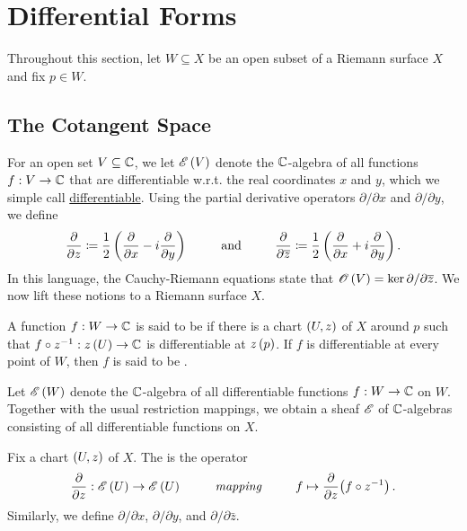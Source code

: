 \documentclass[../Moduli_Spaces_of_Riemann_Surfaces.tex]{subfiles}
\begin{document}
    \section{Differential Forms}
    Throughout this section, let $W\subseteq X$ be an open subset of a Riemann surface $X$ and fix $p\in W$.
    \subsection{The Cotangent Space}
    For an open set $V\subseteq\mathbb{C}$, we let $\mathscr{E}\left(V\right)$ denote the $\mathbb{C}$-algebra of all functions $f:V\to\mathbb{C}$ that are differentiable w.r.t. the real coordinates $x$ and $y$, which we simple call \ul{differentiable}. Using the partial derivative operators $\partial/\partial x$ and $\partial/\partial y$, we define
    \begin{equation*}
        \frac{\partial}{\partial z}\coloneqq\frac{1}{2}\l(\frac{\partial}{\partial x}-i\frac{\partial}{\partial y}\r)\ \ \ \ \ \ \ \ \textrm{and}\ \ \ \ \ \ \ \ \frac{\partial}{\partial\bar{z}}\coloneqq\frac{1}{2}\l(\frac{\partial}{\partial x}+i\frac{\partial}{\partial y}\r).
    \end{equation*}
    In this language, the Cauchy-Riemann equations state that $\mathscr{O}\left(V\right)=\ker\partial/\partial\overline{z}$. We now lift these notions to a Riemann surface $X$.
    \begin{definition}
        A function $f:W\to\mathbb{C}$ is said to be  if there is a chart $\left(U,z\right)$ of $X$ around $p$ such that $f\circ z^{-1}:z\left(U\right)\to\mathbb{C}$ is differentiable at $z\left(p\right)$. If $f$ is differentiable at every point of $W$, then $f$ is said to be .
    \end{definition}
    \vspace{-0.05in}
    \begin{remark}
        Let $\mathscr{E}\left(W\right)$ denote the $\mathbb{C}$-algebra of all differentiable functions $f:W\to\mathbb{C}$ on $W$. Together with the usual restriction mappings, we obtain a sheaf $\mathscr{E}$ of $\mathbb{C}$-algebras consisting of all differentiable functions on $X$.\exqed
    \end{remark}
    \begin{definition}\label{3.1:def:partial_derivative}
        Fix a chart $\left(U,z\right)$ of $X$. The  is the operator
        \begin{equation*}
            \frac{\partial}{\partial z}:\DIFF\l(U\r)\to\DIFF\l(U\r)\ \ \ \ \ \ \ \ \textrm{\it{mapping}}\ \ \ \ \ \ \ \ f\mapsto\frac{\partial}{\partial z}\!\l(f\circ z^{-1}\r).
        \end{equation*}
        Similarly, we define $\partial/\partial x$, $\partial/\partial y$, and $\partial/\partial\bar{z}$.
    \end{definition}
\end{document}
